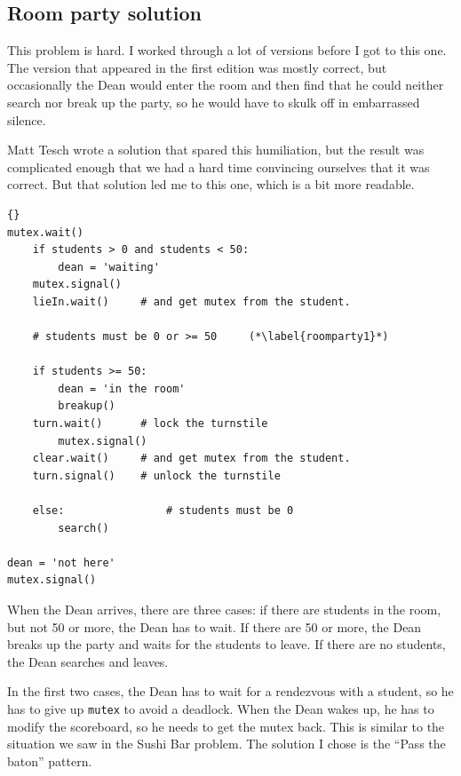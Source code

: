 \documentclass{book}
\begin{document}
\subsection {Room party solution}

This problem is hard.  I worked through a lot of versions before
I got to this one.  The version that appeared in the first edition
was mostly correct, but occasionally the Dean would enter the
room and then find that he could neither search nor break up the
party, so he would have to skulk off in embarrassed silence.

Matt Tesch wrote a solution that spared this humiliation, but the
result was complicated enough that we had a hard time convincing
ourselves that it was correct.  But that solution led me to this one,
which is a bit more readable.

\begin{lstlisting}[title={Room party solution (dean)}]{}
mutex.wait()
    if students > 0 and students < 50:
        dean = 'waiting'
	mutex.signal()
	lieIn.wait()     # and get mutex from the student.

    # students must be 0 or >= 50     (*\label{roomparty1}*)

    if students >= 50:
        dean = 'in the room'
        breakup()
	turn.wait()      # lock the turnstile
        mutex.signal()
	clear.wait()     # and get mutex from the student.
	turn.signal()    # unlock the turnstile

    else:                # students must be 0
        search()

dean = 'not here'
mutex.signal() 
\end{lstlisting}

When the Dean arrives, there are three cases: if there are students in
the room, but not 50 or more, the Dean has to wait.  If there are 50
or more, the Dean breaks up the party and waits for the students to
leave.  If there are no students, the Dean searches and leaves.

In the first two cases, the Dean has to wait for a rendezvous with a
student, so he has to give up {\tt mutex} to avoid a deadlock.  When
the Dean wakes up, he has to modify the scoreboard, so he needs to get
the mutex back.  This is similar to the situation we saw in the Sushi
Bar problem.  The solution I chose is the ``Pass the baton'' pattern.
\end{document}
